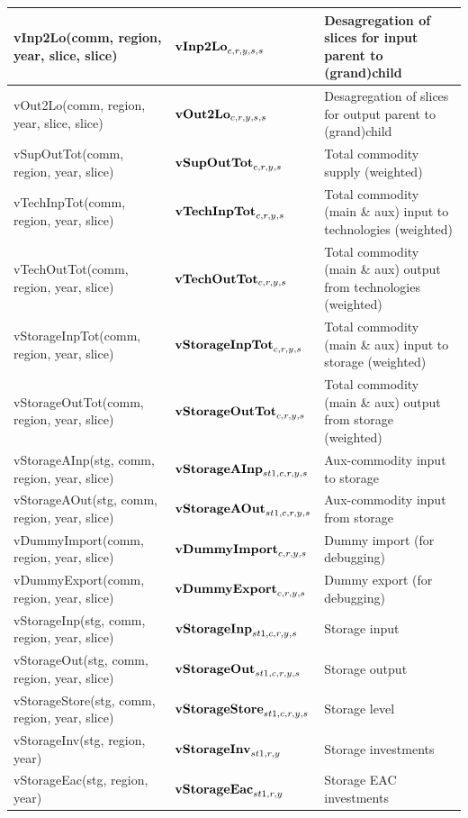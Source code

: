 \documentclass{article}
\begin{document}
\begin{longtable}{|p{10cm}|p{5cm}|p{9cm}|}
 \hline
vInp2Lo(comm, region, year, slice, slice) & ${\bf vInp2Lo}_{c,r,y,s,s}$ & Desagregation of slices for input parent to (grand)child \\ 
 \hline
vOut2Lo(comm, region, year, slice, slice) & ${\bf vOut2Lo}_{c,r,y,s,s}$ & Desagregation of slices for output parent to (grand)child \\ 
 \hline
vSupOutTot(comm, region, year, slice) & ${\bf vSupOutTot}_{c,r,y,s}$ & Total commodity supply (weighted) \\ 
 \hline
vTechInpTot(comm, region, year, slice) & ${\bf vTechInpTot}_{c,r,y,s}$ & Total commodity (main \& aux) input to technologies (weighted) \\ 
 \hline
vTechOutTot(comm, region, year, slice) & ${\bf vTechOutTot}_{c,r,y,s}$ & Total commodity (main \& aux) output from technologies (weighted) \\ 
 \hline
vStorageInpTot(comm, region, year, slice) & ${\bf vStorageInpTot}_{c,r,y,s}$ & Total commodity (main \& aux) input to storage (weighted) \\ 
 \hline
vStorageOutTot(comm, region, year, slice) & ${\bf vStorageOutTot}_{c,r,y,s}$ & Total commodity (main \& aux) output from storage (weighted) \\ 
 \hline
vStorageAInp(stg, comm, region, year, slice) & ${\bf vStorageAInp}_{st1,c,r,y,s}$ & Aux-commodity input to storage \\ 
 \hline
vStorageAOut(stg, comm, region, year, slice) & ${\bf vStorageAOut}_{st1,c,r,y,s}$ & Aux-commodity input from storage \\ 
 \hline
vDummyImport(comm, region, year, slice) & ${\bf vDummyImport}_{c,r,y,s}$ & Dummy import (for debugging) \\ 
 \hline
vDummyExport(comm, region, year, slice) & ${\bf vDummyExport}_{c,r,y,s}$ & Dummy export (for debugging) \\ 
 \hline
vStorageInp(stg, comm, region, year, slice) & ${\bf vStorageInp}_{st1,c,r,y,s}$ & Storage input \\ 
 \hline
vStorageOut(stg, comm, region, year, slice) & ${\bf vStorageOut}_{st1,c,r,y,s}$ & Storage output \\ 
 \hline
vStorageStore(stg, comm, region, year, slice) & ${\bf vStorageStore}_{st1,c,r,y,s}$ & Storage level \\ 
 \hline
vStorageInv(stg, region, year) & ${\bf vStorageInv}_{st1,r,y}$ & Storage investments \\ 
 \hline
vStorageEac(stg, region, year) & ${\bf vStorageEac}_{st1,r,y}$ & Storage EAC investments \\ 

\end{longtable}
\end{document}
